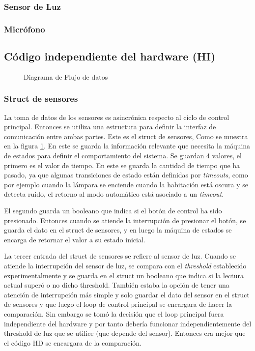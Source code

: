 \subsubsection{Sensor de Luz}
\subsubsection{Micrófono}




\subsection{Código independiente del hardware (HI)}

\begin{figure}
\centering
\scalebox{.5}{}
\caption{Diagrama de Flujo de datos}
\label{fig:data_flow}
\end{figure}


\subsubsection{Struct de sensores}
La toma de datos de los sensores es asincrónica respecto al ciclo de control principal. Entonces se
utiliza una estructura para definir la interfaz de comunicación entre ambas partes. Este es el
struct de sensores, Como se muestra en la figura \ref{fig:data_flow}. En este se guarda la
información relevante que necesita la máquina de estados para definir el comportamiento del
sistema. Se guardan 4 valores, el primero es el valor de tiempo. En este se guarda la cantidad de
tiempo que ha pasado, ya que algunas transiciones de estado están definidas por \textit{timeouts},
como por ejemplo cuando la lámpara se enciende cuando la habitación está oscura y se detecta ruido,
el retorno al modo automático está asociado a un \textit{timeout}.

El segundo guarda un booleano que indica si el botón de control ha sido presionado. Entonces cuando
se atiende la interrupción de presionar el botón, se guarda el dato en el struct de sensores, y
en luego la máquina de estados se encarga de retornar el valor a su estado inicial.

La tercer entrada del struct de sensores se refiere al sensor de luz. Cuando se atiende la
interrupción del sensor de luz, se compara con el \textit{threshold} establecido experimentalmente y
se guarda en el struct un booleano que indica si la lectura actual superó o no dicho
threshold. También estaba la opción de tener una atención de interrupción más simple y solo guardar
el dato del sensor en el struct de sensores y que luego el loop de control principal se encargara de
hacer la comparación. Sin embargo se tomó la decisión que el loop principal fuera independiente del
hardware y por tanto debería funcionar independientemente del threshold de luz que se utilice (que
depende del sensor). Entonces era mejor que el código HD se encargara de la comparación.

